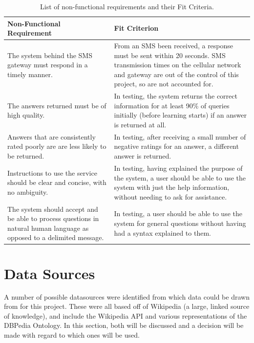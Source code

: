 \documentclass[authoryearcitations]{UoYCSproject}
\begin{document}
\begin{table}
\begin{center}
    \begin{tabular}{| p{6.0cm} | p{6.0cm} |}
    \hline
    Non-Functional Requirement & Fit Criterion \\ \hline
    The system behind the SMS gateway must respond in a timely manner.  & From an SMS been received, a response must be sent within 20 seconds.  SMS transmission times on the cellular network and gateway are out of the control of this project, so are not accounted for. \\ \hline
    The answers returned must be of high quality.  & In testing, the system returns the correct information for at least 90\% of queries initially (before learning starts) if an answer is returned at all. \\ \hline
    Answers that are consistently rated poorly are are less likely to be returned. & In testing, after receiving a small number of negative ratings for an answer, a different answer is returned. \\ \hline
    Instructions to use the service should be clear and concise, with no ambiguity.  & In testing, having explained the purpose of the system, a user should be able to use the system with just the help information, without needing to ask for assistance. \\ \hline  
    The system should accept and be able to process questions in natural human language as opposed to a delimited message. & In testing, a user should be able to use the system for general questions without having had a syntax explained to them. \\ \hline
    \end{tabular}
    \caption{List of non-functional requirements and their Fit Criteria.}
    \label{table:nonFunctionalRequirementsFitCrit}
\end{center}
\end{table}

\section{Data Sources}
A number of possible datasources were identified from which data could be drawn from for this project.  These were all based off of Wikipedia (a large, linked source of knowledge), and include the Wikipedia API and various representations of the DBPedia Ontology.  In this section, both will be discussed and a decision will be made with regard to which ones will be used.
\end{document}
